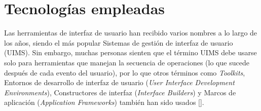 

\section{Tecnologías empleadas}

Las herramientas de interfaz de usuario han recibido varios nombres a lo largo de los años, siendo el más popular Sistemas de gestión de interfaz de usuario (UIMS). Sin embargo, muchas personas sienten que el término UIMS debe usarse solo para herramientas que manejan la secuencia de operaciones (lo que sucede después de cada evento del usuario), por lo que otros términos como \textit{Toolkits}, Entornos de desarrollo de interfaz de usuario (\textit{User Interface Development Environments}), Constructores de interfaz (\textit{Interface Builders}) y Marcos de aplicación (\textit{Application Frameworks}) también han sido usados [\cite{31}].

